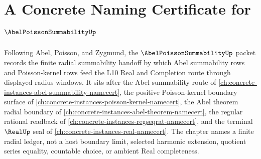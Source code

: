 \chapter{A Concrete Naming Certificate for $\AbelPoissonSummabilityUp$}
\label{ch:concrete-instances-abel-poisson-summability-namecert}

Following Abel, Poisson, and Zygmund, the $\AbelPoissonSummabilityUp$ packet records the finite radial summability handoff by which Abel summability rows and Poisson-kernel rows feed the L10 Real and Completion route through displayed radius windows. It sits after the Abel summability route of \autoref{ch:concrete-instances-abel-summability-namecert}, the positive Poisson-kernel boundary surface of \autoref{ch:concrete-instances-poisson-kernel-namecert}, the Abel theorem radial boundary of \autoref{ch:concrete-instances-abel-theorem-namecert}, the regular rational readback of \autoref{ch:concrete-instances-regseqrat-namecert}, and the terminal $\RealUp$ seal of \autoref{ch:concrete-instances-real-namecert}. The chapter names a finite radial ledger, not a host boundary limit, selected harmonic extension, quotient series equality, countable choice, or ambient Real completeness.

